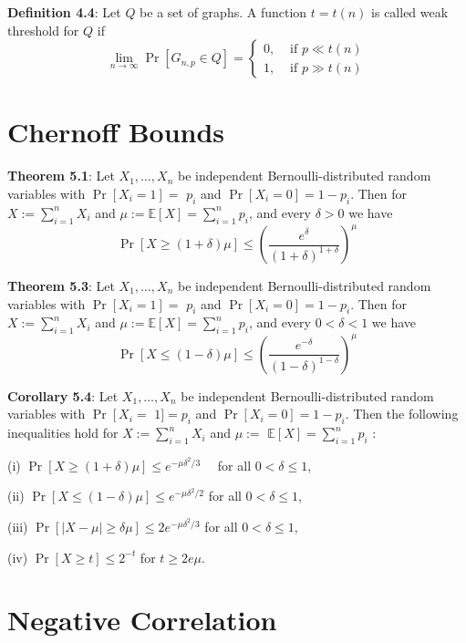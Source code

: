 \textbf{Definition 4.4}: Let $Q$ be a set of graphs. A function $t=t(n)$ is called weak threshold for $Q$ if
$$
\lim _{n \rightarrow \infty} \operatorname{Pr}\left[G_{n, p} \in Q\right]= \begin{cases}0, & \text { if } p \ll t(n) \\ 1, & \text { if } p \gg t(n)\end{cases}
$$

\section{Chernoff Bounds}

\textbf{Theorem 5.1}: Let $X_{1}, \ldots, X_{n}$ be independent Bernoulli-distributed random variables with $\operatorname{Pr}\left[X_{i}=1\right]=$ $p_{i}$ and $\operatorname{Pr}\left[X_{i}=0\right]=1-p_{i}$. Then for $X:=\sum_{i=1}^{n} X_{i}$ and $\mu:=\mathbb{E}[X]=\sum_{i=1}^{n} p_{i}$, and every $\delta>0$ we have
$$
\operatorname{Pr}[X \geq(1+\delta) \mu] \leq\left(\frac{e^{\delta}}{(1+\delta)^{1+\delta}}\right)^{\mu}
$$

\textbf{Theorem 5.3}: Let $X_{1}, \ldots, X_{n}$ be independent Bernoulli-distributed random variables with $\operatorname{Pr}\left[X_{i}=1\right]=$ $p_{i}$ and $\operatorname{Pr}\left[X_{i}=0\right]=1-p_{i}$. Then for $X:=\sum_{i=1}^{n} X_{i}$ and $\mu:=\mathbb{E}[X]=\sum_{i=1}^{n} p_{i}$, and every $0<\delta<1$ we have
$$
\operatorname{Pr}[X \leq(1-\delta) \mu] \leq\left(\frac{e^{-\delta}}{(1-\delta)^{1-\delta}}\right)^{\mu}
$$

\textbf{Corollary 5.4}: Let $X_{1}, \ldots, X_{n}$ be independent Bernoulli-distributed random variables with $\operatorname{Pr}\left[X_{i}=\right.$ $1]=p_{i}$ and $\operatorname{Pr}\left[X_{i}=0\right]=1-p_{i}$. Then the following inequalities hold for $X:=\sum_{i=1}^{n} X_{i}$ and $\mu:=$ $\mathbb{E}[X]=\sum_{i=1}^{n} p_{i}$ :

(i) $\operatorname{Pr}[X \geq(1+\delta) \mu] \leq e^{-\mu \delta^{2} / 3} \quad$ for all $0<\delta \leq 1$,

(ii) $\operatorname{Pr}[X \leq(1-\delta) \mu] \leq e^{-\mu \delta^{2} / 2}$ for all $0<\delta \leq 1$,

(iii) $\operatorname{Pr}[|X-\mu| \geq \delta \mu] \leq 2 e^{-\mu \delta^{2} / 3}$ for all $0<\delta \leq 1$,

(iv) $\operatorname{Pr}[X \geq t] \leq 2^{-t}$ for $t \geq 2 e \mu$.

\section{Negative Correlation}

